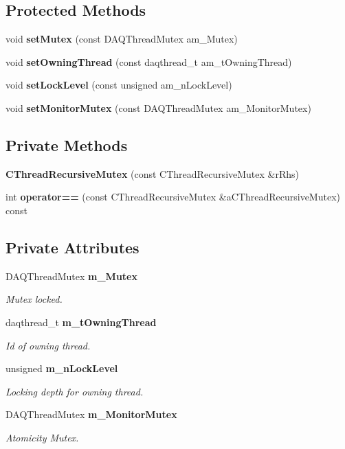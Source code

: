 \subsection*{Protected Methods}
\begin{CompactItemize}
\item 
void {\bf set\-Mutex} (const DAQThread\-Mutex am\_\-Mutex)
\item 
void {\bf set\-Owning\-Thread} (const daqthread\_\-t am\_\-t\-Owning\-Thread)
\item 
void {\bf set\-Lock\-Level} (const unsigned am\_\-n\-Lock\-Level)
\item 
void {\bf set\-Monitor\-Mutex} (const DAQThread\-Mutex am\_\-Monitor\-Mutex)
\end{CompactItemize}
\subsection*{Private Methods}
\begin{CompactItemize}
\item 
{\bf CThread\-Recursive\-Mutex} (const CThread\-Recursive\-Mutex \&r\-Rhs)
\item 
int {\bf operator==} (const CThread\-Recursive\-Mutex \&a\-CThread\-Recursive\-Mutex) const
\end{CompactItemize}
\subsection*{Private Attributes}
\begin{CompactItemize}
\item 
DAQThread\-Mutex {\bf m\_\-Mutex}
\begin{CompactList}\small\item\em Mutex locked.\item\end{CompactList}\item 
daqthread\_\-t {\bf m\_\-t\-Owning\-Thread}
\begin{CompactList}\small\item\em Id of owning thread.\item\end{CompactList}\item 
unsigned {\bf m\_\-n\-Lock\-Level}
\begin{CompactList}\small\item\em Locking depth for owning thread.\item\end{CompactList}\item 
DAQThread\-Mutex {\bf m\_\-Monitor\-Mutex}
\begin{CompactList}\small\item\em Atomicity Mutex.\item\end{CompactList}\end{CompactItemize}


